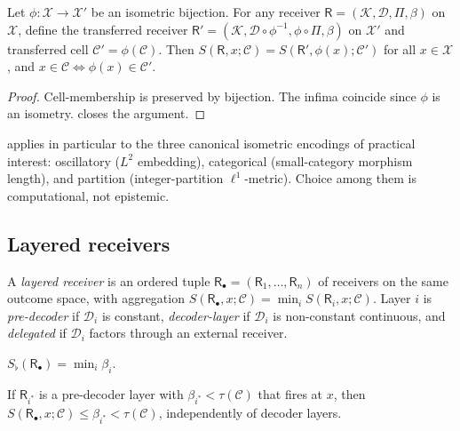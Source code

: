\documentclass[11pt,a4paper]{article}
\newcommand{\K}{\mathcal{K}}
\newcommand{\D}{\mathcal{D}}
\newcommand{\X}{\mathcal{X}}
\newcommand{\Cell}{\mathcal{C}}
\newcommand{\receiver}{\mathsf{R}}
\newcommand{\Sfloor}{S_{\flat}}
\begin{document}
\begin{theorem}\label{thm:repinv}
Let $\phi:\X\to\X'$ be an isometric bijection. For any receiver
$\receiver=(\K,\D,\Pi,\beta)$ on $\X$, define the transferred receiver
$\receiver'=(\K,\D\circ\phi^{-1},\phi\circ\Pi,\beta)$ on $\X'$ and
transferred cell $\Cell'=\phi(\Cell)$. Then
$S(\receiver,x;\Cell)=S(\receiver',\phi(x);\Cell')$ for all $x\in\X$,
and $x\in\Cell\Leftrightarrow\phi(x)\in\Cell'$.
\end{theorem}

\begin{proof}
Cell-membership is preserved by bijection. The infima coincide since
$\phi$ is an isometry.  closes the argument.
\end{proof}

\begin{remark}\label{rem:three-enc}
 applies in particular to the three canonical
isometric encodings of practical interest: oscillatory ($L^2$
embedding), categorical (small-category morphism length), and partition
(integer-partition $\ell^1$-metric). Choice among them is
computational, not epistemic.
\end{remark}

\subsection{Layered receivers}

\begin{definition}\label{def:layered}
A \emph{layered receiver} is an ordered tuple
$\receiver_\bullet=(\receiver_1,\dots,\receiver_n)$ of receivers on the
same outcome space, with aggregation
$S(\receiver_\bullet,x;\Cell)=\min_i S(\receiver_i,x;\Cell)$.
Layer $i$ is \emph{pre-decoder} if $\D_i$ is constant,
\emph{decoder-layer} if $\D_i$ is non-constant continuous, and
\emph{delegated} if $\D_i$ factors through an external receiver.
\end{definition}

\begin{proposition}\label{prop:layered-floor}
$\Sfloor(\receiver_\bullet)=\min_i\beta_i$.
\end{proposition}

\begin{theorem}\label{thm:nonpriv}
If $\receiver_{i^*}$ is a pre-decoder layer with
$\beta_{i^*}<\tau(\Cell)$ that fires at $x$, then
$S(\receiver_\bullet,x;\Cell)\le\beta_{i^*}<\tau(\Cell)$,
independently of decoder layers.
\end{theorem}
\end{document}

